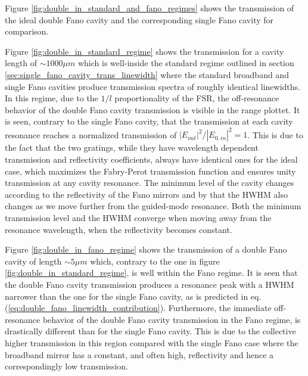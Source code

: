 Figure \ref{fig:double_in_standard_and_fano_regimes} shows the transmission of the ideal double Fano cavity and the corresponding single Fano cavity for comparison. 

Figure \ref{fig:double_in_standard_regime} shows the transmission for a cavity length of $\sim 1000 \mu m$ which is well-inside the standard regime outlined in section \ref{sec:single_fano_cavity_trans_linewidth} where the standard broadband and single Fano cavities produce transmission spectra of roughly identical linewidths. In this regime, due to the $1/l$ proportionality of the FSR, the off-resonance behavior of the double Fano cavity transmission is visible in the range plottet. It is seen, contrary to the single Fano cavity, that the transmission at each cavity resonance reaches a normalized transmission of $|E_{out}|^2/|E_{0,in}|^2=1$. This is due to the fact that the two gratings, while they have wavelength dependent transmission and reflectivity coefficients, always have identical ones for the ideal case, which maximizes the Fabry-Perot transmission function and ensures unity transmission at any cavity resonance. The minimum level of the cavity changes according to the reflectivity of the Fano mirrors and by that the HWHM also changes as we move further from the guided-mode resonance. Both the minimum transmission level and the HWHM converge when moving away from the resonance wavelength, when the reflectivity becomes constant. 

Figure \ref{fig:double_in_fano_regime} shows the transmission of a double Fano cavity of length $\sim 5 \mu m$ which, contrary to the one in figure \ref{fig:double_in_standard_regime}, is well within the Fano regime. It is seen that the double Fano cavity transmission produces a resonance peak with a HWHM narrower than the one for the single Fano cavity, as is predicted in eq. (\ref{eq:double_fano_linewidth_contribution}). Furthermore, the immediate off-resonance behavior of the double Fano cavity transmission in the Fano regime, is drastically different than for the single Fano cavity. This is due to the collective higher transmission in this region compared with the single Fano case where the broadband mirror has a constant, and often high, reflectivity and hence a correspondingly low transmission.

